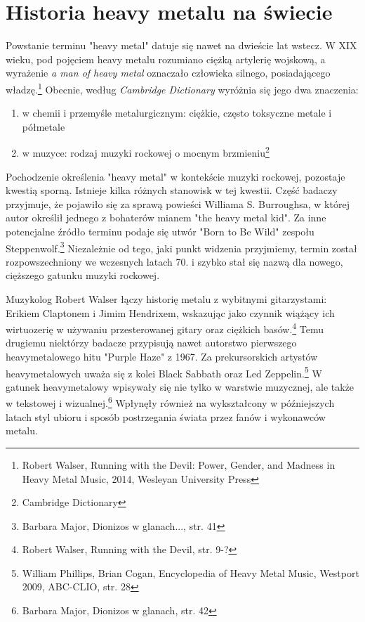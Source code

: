 \documentclass[12pt, a4paper, titlepage]{report}
\begin{document}
\section{Historia heavy metalu na świecie}
Powstanie terminu "heavy metal" datuje się nawet na dwieście lat wstecz. W XIX wieku, pod pojęciem heavy metalu rozumiano ciężką artylerię wojskową, a wyrażenie \textit{a man of heavy metal} oznaczało człowieka silnego, posiadającego władzę.\footnote{Robert Walser, Running with the Devil: Power, Gender, and Madness in Heavy Metal Music, 2014, Wesleyan University Press}  Obecnie, według \textit{Cambridge Dictionary} wyróżnia się jego dwa znaczenia: 
\begin{enumerate}
\item w chemii i przemyśle metalurgicznym: ciężkie, często toksyczne metale  i półmetale
\item w muzyce: rodzaj muzyki rockowej o mocnym brzmieniu\footnote{Cambridge Dictionary}
\end{enumerate}
Pochodzenie określenia "heavy metal" w kontekście muzyki rockowej, pozostaje kwestią sporną. Istnieje kilka różnych stanowisk w tej kwestii. Część badaczy przyjmuje, że pojawiło się za sprawą powieści Williama S. Burroughsa, w której autor określił jednego z bohaterów mianem "the heavy metal kid". Za inne potencjalne źródło terminu podaje się utwór "Born to Be Wild" zespołu Steppenwolf.\footnote{Barbara Major, Dionizos w glanach..., str. 41} Niezależnie od tego, jaki punkt widzenia przyjmiemy, termin został rozpowszechniony we wczesnych latach 70. i szybko stał się nazwą dla nowego, cięższego gatunku muzyki rockowej. 
 
Muzykolog Robert Walser łączy historię metalu z wybitnymi gitarzystami: Erikiem Claptonem i Jimim Hendrixem, wskazując jako czynnik wiążący ich wirtuozerię w używaniu przesterowanej gitary oraz ciężkich basów.\footnote{Robert Walser, Running with the Devil, str. 9-?} Temu drugiemu niektórzy badacze przypisują nawet autorstwo pierwszego heavymetalowego hitu "Purple Haze" z 1967. Za prekursorskich artystów heavymetalowych uważa się z kolei Black Sabbath oraz Led Zeppelin.\footnote{William Phillips, Brian Cogan, Encyclopedia of Heavy Metal Music, Westport 2009, ABC-CLIO, str. 28} W gatunek heavymetalowy wpisywały się nie tylko w warstwie muzycznej, ale także w tekstowej i wizualnej.\footnote{Barbara Major, Dionizos w glanach, str. 42} Wpłynęły również na wykształcony w późniejszych latach styl ubioru i sposób postrzegania świata przez fanów i wykonawców metalu. 
\end{document}
